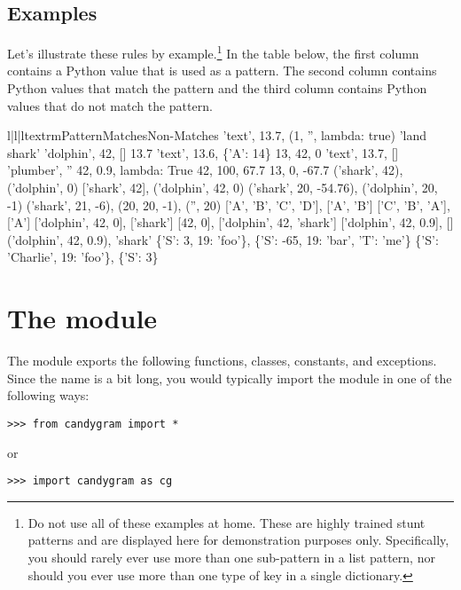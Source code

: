 \documentclass{howto}
\newcommand{\lessthan}[0]{\begin{math}<\end{math}}
\newcommand{\greaterthan}[0]{\begin{math}>\end{math}}
\newcommand{\lessthan}[0]{<}
\newcommand{\greaterthan}[0]{>}
\begin{document}
\subsection{Examples}
Let's illustrate these rules by example.\footnote
{Do not use all of these examples at home. These are highly trained stunt
patterns and are displayed here for demonstration purposes only. Specifically,
you should rarely ever use more than one sub-pattern in a list pattern, nor
should you ever use more than one type of key in a single dictionary.}
 In the table below, the first column contains a Python value that is used as a
pattern. The second column contains Python values that match the pattern and the
third column contains Python values that do not match the pattern.
\begin{tableiii}{l|l|l}{textrm}{Pattern}{Matches}{Non-Matches}
	{'text', 13.7, (1, '', lambda: true)}
	{}
	{'land shark'}
	{'dolphin', 42, []}
	{13.7}
	{'text', 13.6, \{'A': 14\}}
	{13, 42, 0}
	{'text', 13.7, []}
	{'plumber', ''}
	{42, 0.9, lambda: True}
\lineiii{lambda x: x \greaterthan\ 20}
	{42, 100, 67.7}
	{13, 0, -67.7}
	{('shark', 42), ('dolphin', 0)}
	{['shark', 42], ('dolphin', 42, 0)}
\lineiii{(str, 20, lambda x: x \lessthan\ 0)}
	{('shark', 20, -54.76), ('dolphin', 20, -1)}
	{('shark', 21, -6), (20, 20, -1), ('', 20)}
	{['A', 'B', 'C', 'D'], ['A', 'B']}
	{['C', 'B', 'A'], ['A']}
	{['dolphin', 42, 0], ['shark']}
	{[42, 0], ['dolphin', 42, 'shark']}
\lineiii{[Any]}
	{['dolphin', 42, 0.9], []}
	{('dolphin', 42, 0.9), 'shark'}
	{\{'S': 3, 19: 'foo'\}, \{'S': -65, 19: 'bar', 'T': 'me'\}}
	{\{'S': 'Charlie', 19: 'foo'\}, \{'S': 3\}}
\end{tableiii}



\section{The  module}


The  module exports the following functions, classes,
constants, and exceptions. Since the name  is a bit long, you
would typically import the module in one of the following ways:
\begin{verbatim}
>>> from candygram import *
\end{verbatim}
or
\begin{verbatim}
>>> import candygram as cg
\end{verbatim}
\end{document}
